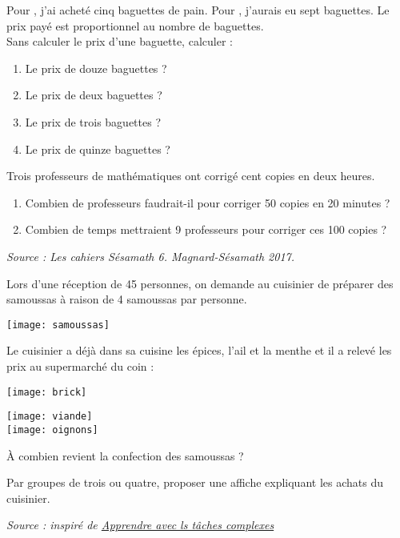 \begin{colonne*exercice}
\medskip

\begin{exercice} %
   Pour , j'ai acheté cinq baguettes de pain. Pour , j'aurais eu sept baguettes. Le prix payé est proportionnel au nombre de baguettes. \\
Sans calculer le prix d'une baguette, calculer :
   \begin{enumerate}
      \item Le prix de douze baguettes ?
      \item Le prix de deux baguettes ?
      \item Le prix de trois baguettes ?
      \item Le prix de quinze baguettes ?
   \end{enumerate}
\end{exercice}

\medskip

\begin{exercice} %
   Trois professeurs de mathématiques ont corrigé cent copies en deux heures.
   \begin{enumerate}
      \item Combien de professeurs faudrait-il pour corriger 50 copies en 20 minutes ?
      \item Combien de temps mettraient 9 professeurs pour corriger ces 100 copies ?
   \end{enumerate}
\end{exercice}

\hfill {\it\footnotesize Source : Les cahiers Sésamath 6. Magnard-Sésamath 2017.}

\end{colonne*exercice}


\Recreation

   Lors d'une réception de 45 personnes, on demande au cuisinier de préparer des samoussas à raison de 4 samoussas par personne.
   \begin{center}
      \texttt{[image: samoussas]}
   \end{center}
   Le cuisinier a déjà dans sa cuisine les épices, l'ail et la menthe et il a relevé les prix au supermarché du coin : \\
   \begin{center}
      \parbox{7.5cm}{\texttt{[image: brick]}} \qquad \parbox{8cm}{\texttt{[image: viande]} \\ [3mm]\texttt{[image: oignons]}}
   \end{center}
   \medskip
   \begin{cadre}[B2][F4]
      À combien revient la confection des samoussas ? 
   \end{cadre}
   Par groupes de trois ou quatre, proposer une affiche expliquant les achats du cuisinier.
    
   \vfill\hfill{\it\footnotesize Source : inspiré de \href{https://irem.univ-reunion.fr/IMG/pdf/apprendre_avec_taches_complexes_au_cycle_3.pdf}{Apprendre avec ls tâches complexes}}


